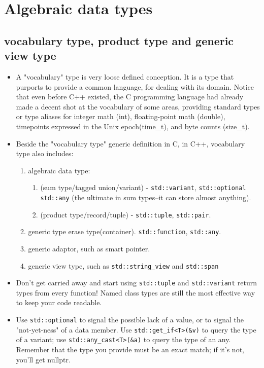 \documentclass[a4paper,11pt,twoside]{book}
\begin{document}
\section{Algebraic data types}

\subsection{vocabulary type, product type and generic view type}
\begin{itemize}
	
	\item A "vocabulary" type is very loose defined conception. It is a type that purports to provide a common language, for dealing with its domain. Notice that even before C++ existed, the C programming language had already made a decent shot at the vocabulary of some areas, providing standard types or type aliases for integer math (int), floating-point math (double), timepoints expressed in the Unix epoch(time\_t), and byte counts (size\_t).
	
	\item Beside the "vocabulary type" generic definition in C, in C++, vocabulary type also includes: 
	\begin{enumerate}
		\item algebraic data type:
		 \begin{enumerate}
		 	\item (sum type/tagged union/variant) - \texttt{std::variant}, \texttt{std::optional} \texttt{std::any} (the ultimate in sum types--it can store almost anything).
		 	\item (product type/record/tuple) - \texttt{std::tuple}, \texttt{std::pair}.
		 \end{enumerate}
		\item generic type erase type(container). \texttt{std::function}, \texttt{std::any}.
		\item generic adaptor, such as smart pointer.
		\item generic view type, such as \texttt{std::string\_view} and \texttt{std::span}
	\end{enumerate}
	
	\item Don't get carried away and start using \texttt{std::tuple} and \texttt{std::variant} return types from every function! Named class types are still the most effective way to keep your code readable. 
	
	\item Use \texttt{std::optional} to signal the possible lack of a value, or to signal the "not-yet-ness" of a data member. Use \texttt{std::get\_if<T>(\&v)} to query the type of a variant; use \texttt{std::any\_cast<T>(\&a)} to query the type of an any. Remember that the type you provide must be an exact match; if it's not, you'll get nullptr.
	

\end{itemize}
\end{document}
